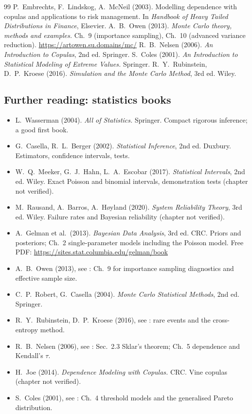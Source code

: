 \documentclass[11pt,a4paper]{article}
\begin{document}
\begin{thebibliography}{99}
 P.~Embrechts, F.~Lindskog, A.~McNeil (2003). Modelling dependence with copulas and applications to risk management. In \emph{Handbook of Heavy Tailed Distributions in Finance}, Elsevier.
 A.~B.~Owen (2013). \emph{Monte Carlo theory, methods and examples.} Ch.~9 (importance sampling), Ch.~10 (advanced variance reduction). \url{https://artowen.su.domains/mc/}
 R.~B.~Nelsen (2006). \emph{An Introduction to Copulas}, 2nd ed. Springer.
 S.~Coles (2001). \emph{An Introduction to Statistical Modeling of Extreme Values.} Springer.
 R.~Y.~Rubinstein, D.~P.~Kroese (2016). \emph{Simulation and the Monte Carlo Method}, 3rd ed. Wiley.
\end{thebibliography}

\subsection*{Further reading: statistics books}
\begin{itemize}
\item L.~Wasserman (2004). \emph{All of Statistics.} Springer. Compact rigorous inference; a good first book.
\item G.~Casella, R.~L.~Berger (2002). \emph{Statistical Inference}, 2nd ed. Duxbury. Estimators, confidence intervals, tests.
\item W.~Q.~Meeker, G.~J.~Hahn, L.~A.~Escobar (2017). \emph{Statistical Intervals}, 2nd ed. Wiley. Exact Poisson and binomial intervals, demonstration tests (chapter not verified).
\item M.~Rausand, A.~Barros, A.~Høyland (2020). \emph{System Reliability Theory}, 3rd ed. Wiley. Failure rates and Bayesian reliability (chapter not verified).
\item A.~Gelman et al.\ (2013). \emph{Bayesian Data Analysis}, 3rd ed. CRC. Priors and posteriors; Ch.~2 single-parameter models including the Poisson model. Free PDF: \url{https://sites.stat.columbia.edu/gelman/book}
\item A.~B.~Owen (2013), see \cite{owen2013}: Ch.~9 for importance sampling diagnostics and effective sample size.
\item C.~P.~Robert, G.~Casella (2004). \emph{Monte Carlo Statistical Methods}, 2nd ed. Springer.
\item R.~Y.~Rubinstein, D.~P.~Kroese (2016), see \cite{rubinstein2016}: rare events and the cross-entropy method.
\item R.~B.~Nelsen (2006), see \cite{nelsen2006}: Sec.~2.3 Sklar's theorem; Ch.~5 dependence and Kendall's $\tau$.
\item H.~Joe (2014). \emph{Dependence Modeling with Copulas.} CRC. Vine copulas (chapter not verified).
\item S.~Coles (2001), see \cite{coles2001}: Ch.~4 threshold models and the generalised Pareto distribution.
\end{itemize}
\endgroup
\end{document}
